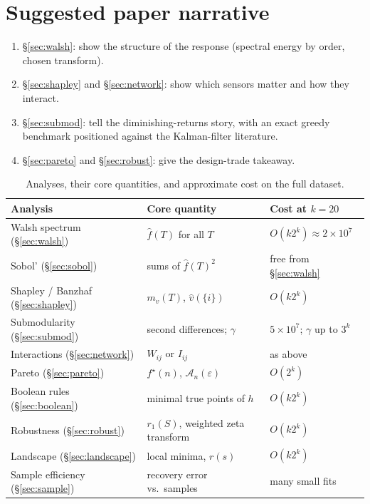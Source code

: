 \documentclass[11pt]{article}
\newcommand{\fh}{\widehat{f}}
\begin{document}
\section{Suggested paper narrative}\label{sec:narrative}

\begin{enumerate}[itemsep=2pt]
  \item \S\ref{sec:walsh}: show the structure of the response (spectral energy by order, chosen transform).
  \item \S\ref{sec:shapley} and \S\ref{sec:network}: show which sensors matter and how they interact.
  \item \S\ref{sec:submod}: tell the diminishing-returns story, with an exact greedy benchmark positioned against the Kalman-filter literature.
  \item \S\ref{sec:pareto} and \S\ref{sec:robust}: give the design-trade takeaway.
\end{enumerate}

\begin{table}[h]
\centering
\small
\begin{tabularx}{\linewidth}{@{}lXl@{}}
\toprule
Analysis & Core quantity & Cost at $k=20$ \\
\midrule
Walsh spectrum (\S\ref{sec:walsh})        & $\fh(T)$ for all $T$                            & $O(k2^k)\approx2\times10^7$ \\
Sobol' (\S\ref{sec:sobol})                & sums of $\fh(T)^2$                              & free from \S\ref{sec:walsh} \\
Shapley / Banzhaf (\S\ref{sec:shapley})   & $m_v(T)$, $\widehat{v}(\{i\})$                  & $O(k2^k)$ \\
Submodularity (\S\ref{sec:submod})        & second differences; $\gamma$                    & $5\times10^7$; $\gamma$ up to $3^k$ \\
Interactions (\S\ref{sec:network})        & $W_{ij}$ or $I_{ij}$                            & as above \\
Pareto (\S\ref{sec:pareto})               & $f^\star(n)$, $\mathcal{A}_n(\varepsilon)$     & $O(2^k)$ \\
Boolean rules (\S\ref{sec:boolean})       & minimal true points of $h$                      & $O(k2^k)$ \\
Robustness (\S\ref{sec:robust})           & $r_1(S)$, weighted zeta transform               & $O(k2^k)$ \\
Landscape (\S\ref{sec:landscape})         & local minima, $r(s)$                            & $O(k2^k)$ \\
Sample efficiency (\S\ref{sec:sample})    & recovery error vs.\ samples                     & many small fits \\
\bottomrule
\end{tabularx}
\caption{Analyses, their core quantities, and approximate cost on the full dataset.}
\end{table}

\printbibliography
\end{document}
